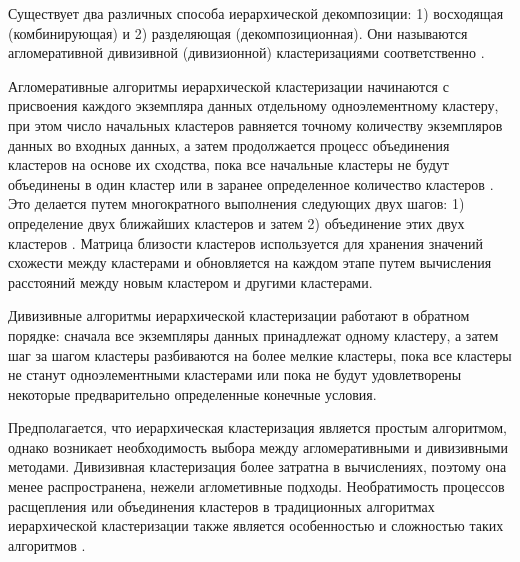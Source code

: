 Существует два различных способа иерархической декомпозиции: 1) восходящая (комбинирующая) и 2) разделяющая (декомпозиционная). Они называются агломеративной дивизивной (дивизионной) кластеризациями соответственно \cite{online:what_is_hier_clust}.

Агломеративные алгоритмы иерархической кластеризации начинаются с присвоения каждого экземпляра данных отдельному одноэлементному кластеру, при этом число начальных кластеров равняется точному количеству экземпляров данных во входных данных, а затем продолжается процесс объединения кластеров на основе их сходства, пока все начальные кластеры не будут объединены в один кластер или в заранее определенное количество кластеров \cite{online:unders_hier_cl}. Это делается путем многократного выполнения следующих двух шагов: 1) определение двух ближайших кластеров и затем 2) объединение этих двух кластеров \cite{online:what_is_hier_clust}. Матрица близости кластеров используется для хранения значений схожести между кластерами и обновляется на каждом этапе путем вычисления расстояний между новым кластером и другими кластерами.

Дивизивные алгоритмы иерархической кластеризации работают в обратном порядке: сначала все экземпляры данных принадлежат одному кластеру, а затем шаг за шагом кластеры разбиваются на более мелкие кластеры, пока все кластеры не станут одноэлементными кластерами или пока не будут удовлетворены некоторые предварительно определенные конечные условия.

Предполагается, что иерархическая кластеризация является простым алгоритмом, однако возникает необходимость выбора между агломеративными и дивизивными методами. Дивизивная кластеризация более затратна в вычислениях, поэтому она менее распространена, нежели аглометивные подходы. Необратимость процессов расщепления или объединения кластеров в традиционных алгоритмах иерархической кластеризации также является особенностью и сложностью таких алгоритмов \cite{article:8_review_mot_cl_alg}.

